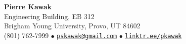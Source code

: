 \documentclass[letterpaper,11pt]{article}
\def\name{Pierre Kawak}
\begin{document}


\begin{center}
  {\LARGE \textbf{Pierre Kawak} }\\[1ex]
  Engineering Building, EB 312 \\
  Brigham Young University, Provo, UT 84602 \\  
  (801) 762-7999 $\bullet$ \href{mailto:pskawak@gmail.com}{\tt pskawak@gmail.com} $\bullet$ \href{https://linktr.ee/pkawak}{\tt linktr.ee/pkawak} \\
\end{center}


\vspace{-0.8cm}
\end{document}
